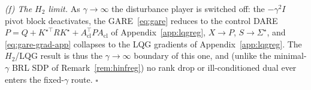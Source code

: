 \documentclass[twocolumn,amsthm]{autart}
\begin{document}
\emph{(f) The $H_2$ limit.} As $\gamma\!\to\!\infty$ the disturbance player is
switched off: the $-\gamma^2 I$ pivot block deactivates, the GARE~\eqref{eq:gare}
reduces to the control DARE $P=Q+K^{\star\top}RK^\star+A_{\mathrm{cl}}^\top
PA_{\mathrm{cl}}$ of Appendix~\ref{app:lqgreg}, $X\!\to\!P$,
$S\!\to\!\Sigma^\star$, and \eqref{eq:gare-grad-app} collapses to the LQG
gradients of Appendix~\ref{app:lqgreg}. The $H_2$/LQG result is thus the
$\gamma\!\to\!\infty$ boundary of this one, and (unlike the minimal-$\gamma$ BRL
SDP of Remark~\ref{rem:hinfreg}) no rank drop or ill-conditioned dual ever enters
the fixed-$\gamma$ route. \hfill$\square$




%
%
\end{document}
